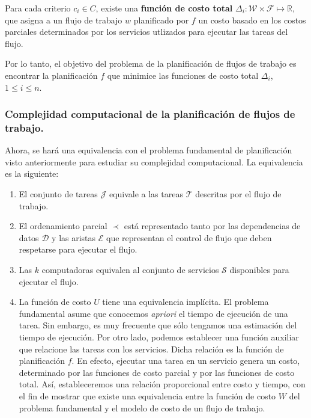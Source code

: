 \begin{defn}
Para cada criterio $c_i \in C$, existe una \textbf{función de costo total} $\Delta_i : \mathcal{W} \times \mathcal{F} \mapsto \mathbb{R}$, que asigna a un flujo de trabajo $w$ planificado por $f$ un costo basado en los costos parciales determinados por los servicios utlizados para ejecutar las tareas del flujo.
\end{defn}

\noindent Por lo tanto, el objetivo del problema de la planificación de flujos de trabajo es encontrar la planificación $f$ que minimice las funciones de costo total $\Delta_i$, $1 \le i \le n$.

\subsubsection{Complejidad computacional de la planificación de flujos de trabajo.}
Ahora, se hará una equivalencia con el problema fundamental de planificación visto anteriormente para estudiar su complejidad computacional. La equivalencia es la siguiente:

\begin{enumerate}
\item El conjunto de tareas $\mathcal{J}$ equivale a las tareas $\mathcal{T}$ descritas por el flujo de trabajo.

\item El ordenamiento parcial $\prec$ está representado tanto por las dependencias de datos $\mathcal{D}$ y las aristas $\mathcal{E}$ que representan el control de flujo que deben respetarse para ejecutar el flujo.

\item Las $k$ computadoras equivalen al conjunto de servicios $\mathcal{S}$ disponibles para ejecutar el flujo.

\item La función de costo $U$ tiene una equivalencia implícita. El problema fundamental asume que conocemos \emph{apriori} el tiempo de ejecución de una tarea. Sin embargo, es muy frecuente que sólo tengamos una estimación del tiempo de ejecución. Por otro lado, podemos establecer una función auxiliar que relacione las tareas con los servicios. Dicha relación es la función de planificación $f$. En efecto, ejecutar una tarea en un servicio genera un costo, determinado por las funciones de costo parcial y por las funciones de costo total. Así, estableceremos una relación proporcional entre costo y tiempo, con el fin de mostrar que existe una equivalencia entre la función de costo $W$ del problema fundamental y el modelo de costo de un flujo de trabajo.
\end{enumerate}

